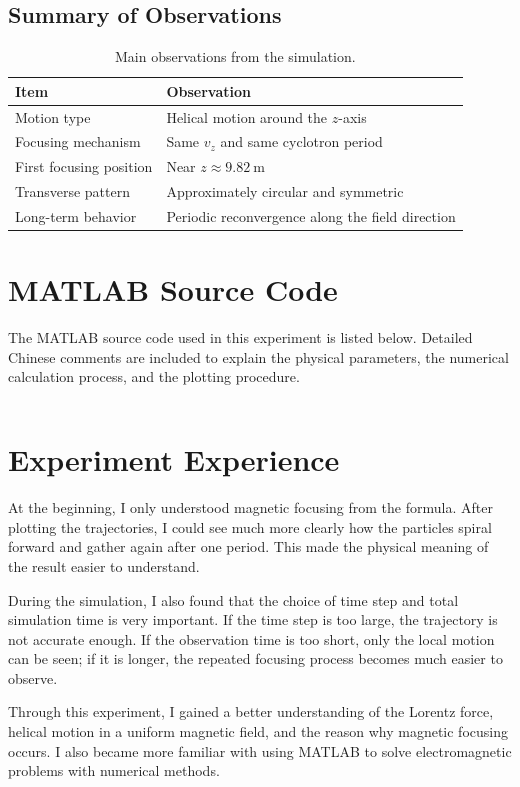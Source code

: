 \documentclass[12pt,a4paper]{article}
\begin{document}
\subsection{Summary of Observations}
\begin{table}[H]
    \centering
    \begin{tabular}{@{}ll@{}}
        \toprule
        Item & Observation \\
        \midrule
        Motion type & Helical motion around the $z$-axis \\
        Focusing mechanism & Same $v_z$ and same cyclotron period \\
        First focusing position & Near $z \approx 9.82~\text{m}$ \\
        Transverse pattern & Approximately circular and symmetric \\
        Long-term behavior & Periodic reconvergence along the field direction \\
        \bottomrule
    \end{tabular}
    \caption{Main observations from the simulation.}
\end{table}

\section{MATLAB Source Code}
The MATLAB source code used in this experiment is listed below. Detailed Chinese comments are included to explain the physical parameters, the numerical calculation process, and the plotting procedure.

\inputminted{matlab}{lab4_code.m}

\section{Experiment Experience}
At the beginning, I only understood magnetic focusing from the formula. After plotting the trajectories, I could see much more clearly how the particles spiral forward and gather again after one period. This made the physical meaning of the result easier to understand.

During the simulation, I also found that the choice of time step and total simulation time is very important. If the time step is too large, the trajectory is not accurate enough. If the observation time is too short, only the local motion can be seen; if it is longer, the repeated focusing process becomes much easier to observe.

Through this experiment, I gained a better understanding of the Lorentz force, helical motion in a uniform magnetic field, and the reason why magnetic focusing occurs. I also became more familiar with using MATLAB to solve electromagnetic problems with numerical methods.
\end{document}

